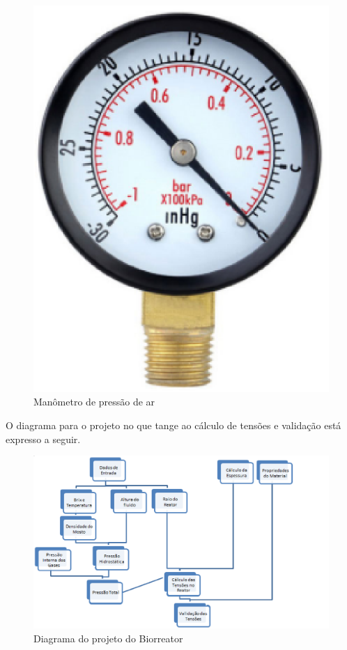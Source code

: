 \begin{figure}[h]
 \centering
 \includegraphics[keepaspectratio=true,scale=0.4]{figuras/alivio.eps}
 \caption{Manômetro de pressão de ar}
 \label{alivio}
\end{figure}

O diagrama para o projeto no que tange ao cálculo de tensões e validação está expresso a seguir.

\begin{figure}[h]
 \centering
 \includegraphics[keepaspectratio=true,scale=0.5]{figuras/diagrama.eps}
 \caption{Diagrama do projeto do Biorreator}
 \label{diagrama}
\end{figure}

